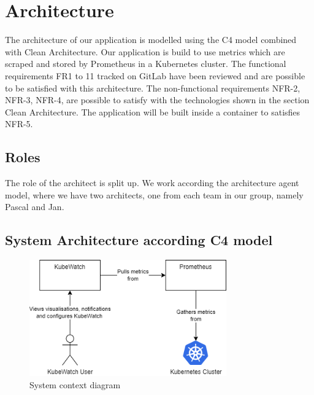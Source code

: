 \chapter{Architecture}

    

The architecture of our application is modelled using the C4 model combined with Clean Architecture.
Our application is build to use metrics which are scraped and stored by Prometheus in a Kubernetes cluster.
The functional requirements FR1 to 11 tracked on GitLab have been reviewed and are possible to be satisfied with this architecture. 
The non-functional requirements NFR-2, NFR-3, NFR-4, are possible to satisfy with the technologies shown in the section Clean Architecture.
The application will be built inside a container to satisfies NFR-5.

\section{Roles}
The role of the architect is split up. We work according the architecture agent model, where we have two architects, one from each team in our group, namely Pascal and Jan.

\section{System Architecture according C4 model}
\begin{figure}[H]
  \centering
  \includegraphics[height=5cm]{resources/System_context_diagram.png}
  \caption{System context diagram}
  \label{fig:system-context-diagram}
\end{figure}

